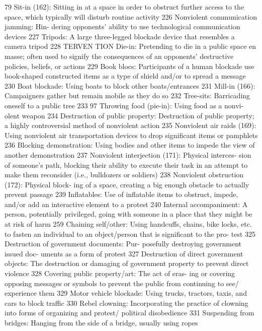 \documentclass[twoside,a4paper,12pt,fleqn,openany]{extbook}
\begin{document}
 79
Sit-in (162): Sitting in at a space in order to
obstruct further access to the space, which
typically will disturb routine activity
 226
Nonviolent communication jamming: Hin-
dering opponents’ ability to use technological
communication devices
 227
Tripods: A large three-legged blockade device
that resembles a camera tripod
 228
TERVEN TION
Die-in: Pretending to die in a public space en
masse; often used to signify the consequences
of an opponents’ destructive policies, beliefs,
or actions
 229
Book blocs: Participants of a human blockade
use book-shaped constructed items as a type
of shield and/or to spread a message
 230
Boat blockade: Using boats to block other
boats/entrances
 231
Mill-in (166): Campaigners gather but remain
mobile as they do so
 232
Tree-sits: Barricading oneself to a public
tree
 233
97
Throwing food (pie-in): Using food as a nonvi-
olent weapon
 234
Destruction of public property: Destruction of
public property; a highly controversial method
of nonviolent action
 235
Nonviolent air raids (169): Using nonviolent air
transportation devices to drop significant items
or pamphlets
 236
Blocking demonstration: Using bodies and
other items to impede the view of another
demonstration
 237
Nonviolent interjection (171): Physical interces-
sion of someone’s path, blocking their ability to
execute their task in an attempt to make them
reconsider (i.e., bulldozers or soldiers)
 238
Nonviolent obstruction (172): Physical block-
ing of a space, creating a big enough obstacle
to actually prevent passage
 239
Inflatables: Use of inflatable items to obstruct,
impede, and/or add an interactive element to
a protest
 240
Internal accompaniment: A person, potentially
privileged, going with someone in a place that
they might be at risk of harm
 259
Chaining self/other: Using handcuffs, chains,
bike locks, etc. to fasten an individual to an
object/person that is significant to the pro-
test
 325
Destruction of government documents: Pur-
posefully destroying government issued doc-
uments as a form of protest
 327
Destruction of direct government objects:
The destruction or damaging of government
property to prevent direct violence
 328
Covering public property/art: The act of eras-
ing or covering opposing messages or symbols
to prevent the public from continuing to see/
experience them
 329
Motor vehicle blockade: Using trucks, tractors,
taxis, and cars to block traffic
 330
Rebel clowning: Incorporating the practice of
clowning into forms of organizing and protest/
political disobedience
 331
Suspending from bridges: Hanging from the
side of a bridge, usually using ropes
\end{document}
